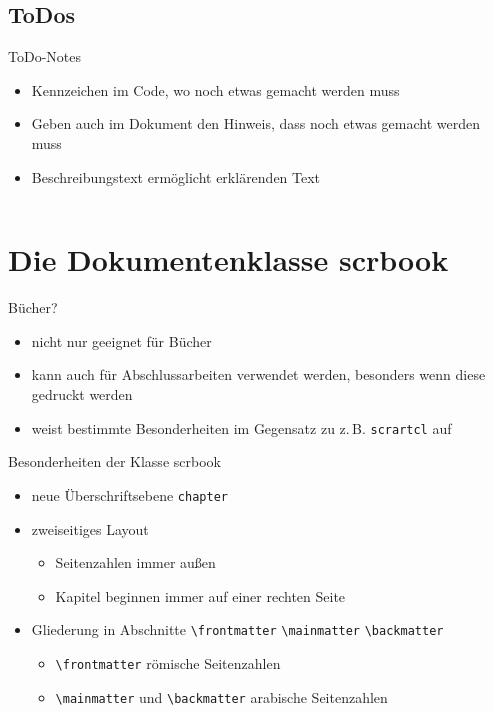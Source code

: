 \documentclass[presentation,aspectratio=169]{beamer}
\begin{document}
\subsection{ToDos}

\begin{frame}[fragile]{ToDo-Notes}
  \begin{itemize}
    \item Kennzeichen im Code, wo noch etwas gemacht werden muss
    \item Geben auch im Dokument den Hinweis, dass noch etwas gemacht werden muss
    \item Beschreibungstext ermöglicht erklärenden Text
  \end{itemize}
  \inputminted{latex}{codebeispiele/todonotes.tex}
\end{frame}

\section{Die Dokumentenklasse scrbook}

\begin{frame}[fragile]{Bücher?}
  \begin{itemize}
    \item nicht nur geeignet für Bücher
    \item kann auch für Abschlussarbeiten verwendet werden, besonders wenn diese gedruckt werden
    \item weist bestimmte Besonderheiten im Gegensatz zu z.\,B. \verb|scrartcl| auf
  \end{itemize}
\end{frame}

\begin{frame}[fragile]{Besonderheiten der Klasse scrbook}
  \begin{itemize}
    \item neue Überschriftsebene \verb|chapter|
    \item zweiseitiges Layout
      \begin{itemize}
        \item Seitenzahlen immer außen
        \item Kapitel beginnen immer auf einer rechten Seite
      \end{itemize}
    \item Gliederung in Abschnitte \verb|\frontmatter| \verb|\mainmatter| \verb|\backmatter|
      \begin{itemize}
        \item \verb|\frontmatter| römische Seitenzahlen
        \item \verb|\mainmatter| und \verb|\backmatter| arabische Seitenzahlen
      \end{itemize}
  \end{itemize}
\end{frame}
\end{document}

